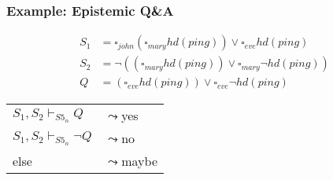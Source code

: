 \begin{frame}[fragile]
    \def\mybox#1{\square_{#1}}
    \def\mydia#1{\lozenge_{#1}}
    \def\sfiven{{S5_n}}
    \frametitle{Example: Epistemic Q\&A}
    \centering

    {\color{logicfont}
        \begin{align*}
            S_1 &= \mybox{john}(\mybox{mary} hd(ping))\vee \mybox{eve}hd(ping)\\
            S_2 &= \neg((\mybox{mary}hd(ping)) \vee \mybox{mary}\neg hd(ping))\\
            Q &= (\mybox{eve}hd(ping)) \vee \mybox{eve}\neg hd(ping)
        \end{align*}
    }

    \begin{table}
        \begin{tabular}{l l}
            $S_1, S_2 \vdash_\sfiven Q$\quad      &$\leadsto$\quad yes\\
            $S_1, S_2 \vdash_\sfiven \neg Q$\quad &$\leadsto$\quad no\\
            else &$\leadsto$\quad maybe
        \end{tabular}
    \end{table}
\end{frame}
